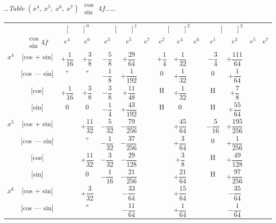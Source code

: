 \documentclass[10pt,a4paper]{article}
\newcommand{\tabletitle}[2]{%
  \begin{center}
  \ldots\textit{Table} #1 $\displaystyle\begin{smallmatrix} \cos \\ \sin \end{smallmatrix}$ #2\ldots
  \end{center}
}
\begin{document}
\newpage
\tabletitle{$(x^4,\ x^5,\ x^6,\ x^7)$}{$4f\ldots$}

\begin{center}
\small
\begin{tabular}{|c|c|c|c|c|c|c|c|c|c|c|c|}
\hline
& &  &  &  &  \\
& $\begin{smallmatrix} \cos \\ \sin \end{smallmatrix} 4f$ & $e^4$ & $e^6$ & $e^3$ & $e^5$ & $e^7$ & $e^2$ & $e^4$ & $e^6$ & $e^1$ & $e^3$ & $e^5$ & $e^7$ \\
\hline
{} & [cos + sin] & $+\dfrac{1}{16}$ & $+\dfrac{3}{8}$ & $-\dfrac{5}{8}$ & $+\dfrac{29}{64}$ & & $+\dfrac{1}{4}$ & $+\dfrac{1}{32}$ & & $-\dfrac{3}{4}$ & $+\dfrac{111}{64}$ \\
& [cos --- sin] & $"$ & $"$ & $-\dfrac{1}{8}$ & $+\dfrac{1}{192}$ & & $0$ & $+\dfrac{1}{32}$ & & $0$ & $+\dfrac{1}{64}$ \\
& [cos] & $+\dfrac{1}{16}$ & $+\dfrac{3}{8}$ & $-\dfrac{3}{8}$ & $+\dfrac{11}{48}$ & & H & $+\dfrac{1}{32}$ & & H & $+\dfrac{7}{8}$ \\
& [sin] & $0$ & $0$ & $-\dfrac{1}{4}$ & $+\dfrac{43}{192}$ & & H & $0$ & & H & $+\dfrac{55}{64}$ \\
\hline
{} & [cos + sin] & & $+\dfrac{11}{32}$ & $-\dfrac{5}{32}$ & $-\dfrac{79}{256}$ & & & $+\dfrac{45}{64}$ & & $-\dfrac{5}{16}$ & $+\dfrac{195}{256}$ \\
& [cos --- sin] & & $"$ & $-\dfrac{1}{32}$ & $-\dfrac{37}{256}$ & & & $+\dfrac{3}{64}$ & & $0$ & $+\dfrac{1}{256}$ \\
& [cos] & & $+\dfrac{11}{32}$ & $-\dfrac{3}{32}$ & $-\dfrac{29}{128}$ & & & $+\dfrac{3}{8}$ & & H & $+\dfrac{49}{128}$ \\
& [sin] & & $0$ & $-\dfrac{1}{16}$ & $-\dfrac{21}{256}$ & & & $+\dfrac{21}{64}$ & & H & $+\dfrac{97}{256}$ \\
\hline
{} & [cos + sin] & & $+\dfrac{3}{32}$ & & $-\dfrac{33}{64}$ & & & $+\dfrac{15}{64}$ & & & $-\dfrac{35}{64}$ \\
& [cos --- sin] & & $"$ & & $-\dfrac{11}{64}$ & & & $+\dfrac{1}{64}$ & & & $-\dfrac{1}{64}$ \\

\end{tabular}
\end{center}
\end{document}
